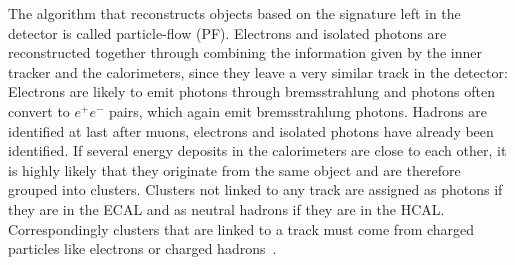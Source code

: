 The algorithm that reconstructs objects based on the signature left in the detector is called particle-flow (PF).
Electrons and isolated photons are reconstructed together through combining the information given by the inner tracker and the calorimeters, since they leave a very similar track
in the detector: Electrons are likely to emit photons through bremsstrahlung and photons often convert to $e^+e^-$ pairs, which again emit bremsstrahlung photons. 
Hadrons are identified at last after muons, electrons and isolated photons have already been identified.
If several energy deposits in the calorimeters are close to each other, it is highly likely that they originate from the same object and are therefore grouped into clusters.
Clusters not linked to any track are assigned as photons if they are in the ECAL and as neutral hadrons if they are in the HCAL. 
Correspondingly clusters that are linked to a track must come from charged particles like electrons or charged hadrons~\cite{CMS:2017pf}. 